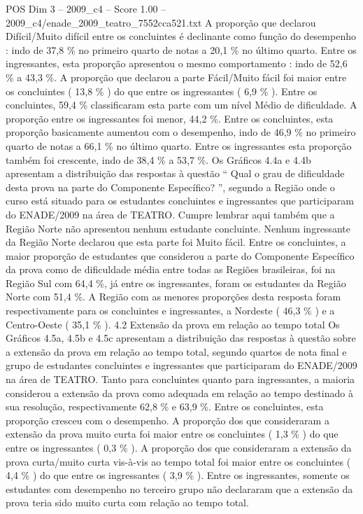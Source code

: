 \begin{textsample}{POS Dim 3 – 2009\_c4 – Score 1.00 – 2009\_c4/enade\_2009\_teatro\_7552cca521.txt}
A proporção que declarou Difícil/Muito difícil entre os concluintes é declinante como função do desempenho : indo de 37,8 \% no primeiro quarto de notas a 20,1 \% no último quarto.
Entre os ingressantes, esta proporção apresentou o mesmo comportamento : indo de 52,6 \% a 43,3 \%.
A proporção que declarou a parte Fácil/Muito fácil foi maior entre os concluintes ( 13,8 \% ) do que entre os ingressantes ( 6,9 \% ).
Entre os concluintes, 59,4 \% classificaram esta parte com um nível Médio de dificuldade.
A proporção entre os ingressantes foi menor, 44,2 \%.
Entre os concluintes, esta proporção basicamente aumentou com o desempenho, indo de 46,9 \% no primeiro quarto de notas a 66,1 \% no último quarto.
Entre os ingressantes esta proporção também foi crescente, indo de 38,4 \% a 53,7 \%.
Os Gráficos 4.4a e 4.4b apresentam a distribuição das respostas à questão “ Qual o grau de dificuldade desta prova na parte do Componente Específico? ”, segundo a Região onde o curso está situado para os estudantes concluintes e ingressantes que participaram do ENADE/2009 na área de TEATRO.
Cumpre lembrar aqui também que a Região Norte não apresentou nenhum estudante concluinte.
Nenhum ingressante da Região Norte declarou que esta parte foi Muito fácil.
Entre os concluintes, a maior proporção de estudantes que considerou a parte do Componente Específico da prova como de dificuldade média entre todas as Regiões brasileiras, foi na Região Sul com 64,4 \%, já entre os ingressantes, foram os estudantes da Região Norte com 51,4 \%.
A Região com as menores proporções desta resposta foram respectivamente para os concluintes e ingressantes, a Nordeste ( 46,3 \% ) e a Centro-Oeste ( 35,1 \% ). 4.2 Extensão da prova em relação ao tempo total Os Gráficos 4.5a, 4.5b e 4.5c apresentam a distribuição das respostas à questão sobre a extensão da prova em relação ao tempo total, segundo quartos de nota final e grupo de estudantes concluintes e ingressantes que participaram do ENADE/2009 na área de TEATRO.
Tanto para concluintes quanto para ingressantes, a maioria considerou a extensão da prova como adequada em relação ao tempo destinado à sua resolução, respectivamente 62,8 \% e 63,9 \%.
Entre os concluintes, esta proporção cresceu com o desempenho.
A proporção dos que consideraram a extensão da prova muito curta foi maior entre os concluintes ( 1,3 \% ) do que entre os ingressantes ( 0,3 \% ).
A proporção dos que consideraram a extensão da prova curta/muito curta vis-à-vis ao tempo total foi maior entre os concluintes ( 4,4 \% ) do que entre os ingressantes ( 3,9 \% ).
Entre os ingressantes, somente os estudantes com desempenho no terceiro grupo não declararam que a extensão da prova teria sido muito curta com relação ao tempo total.

\end{textsample}
